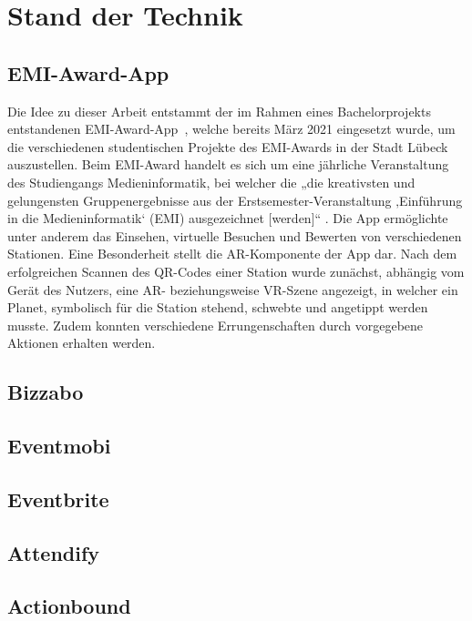 \chapter{Stand der Technik}


\section{EMI-Award-App}



Die Idee zu dieser Arbeit entstammt der im Rahmen eines Bachelorprojekts
entstandenen EMI-Award-App~\cite{Canzler2021}, welche bereits März 2021
eingesetzt wurde, um die verschiedenen studentischen Projekte des EMI-Awards in
der Stadt Lübeck auszustellen. Beim EMI-Award handelt es sich um eine jährliche
Veranstaltung des Studiengangs Medieninformatik, bei welcher die „die
kreativsten und gelungensten Gruppenergebnisse aus der
Erstsemester-Veranstaltung ‚Einführung in die Medieninformatik‘ (EMI)
ausgezeichnet [werden]“ \cite{UniversitatzuLubeck2021}. Die App ermöglichte
unter anderem das Einsehen, virtuelle Besuchen und Bewerten von verschiedenen
Stationen. Eine Besonderheit stellt die AR-Komponente der App dar. Nach dem
erfolgreichen Scannen des QR-Codes einer Station wurde zunächst, abhängig vom
Gerät des Nutzers, eine AR- beziehungsweise VR-Szene angezeigt, in welcher ein
Planet, symbolisch für die Station stehend, schwebte und angetippt werden
musste. Zudem konnten verschiedene Errungenschaften durch vorgegebene Aktionen
erhalten werden.

\section{Bizzabo}

\section{Eventmobi}

\section{Eventbrite}

\section{Attendify}

\section{Actionbound}